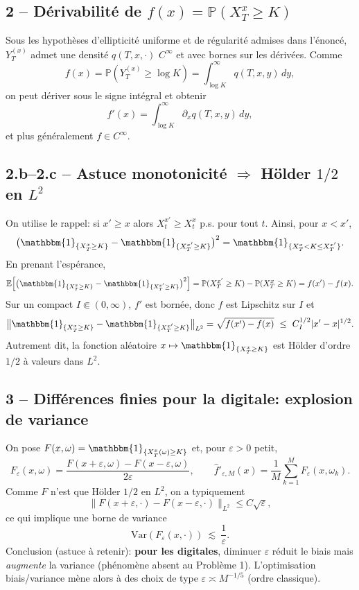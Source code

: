 \documentclass[11pt,a4paper]{article}
\newcommand{\E}{\mathbb{E}}
\newcommand{\Pp}{\mathbb{P}}
\newcommand{\1}{\mathbbm{1}}
\newcommand{\Var}{\mathrm{Var}}
\theoremstyle{plain}
\theoremstyle{definition}
\begin{document}
\subsection{2 -- Dérivabilité de $f(x)=\Pp(X_T^x\ge K)$}
Sous les hypothèses d'ellipticité uniforme et de régularité admises dans l'énoncé, $Y_T^{(x)}$ admet une densité $q(T,x,\cdot)$ $C^\infty$ et avec bornes sur les dérivées.
Comme
\[
f(x)=\Pp(Y_T^{(x)}\ge \log K)=\int_{\log K}^{\infty} q(T,x,y)\,dy,
\]
on peut dériver sous le signe intégral et obtenir
\[
f'(x)=\int_{\log K}^{\infty}\partial_x q(T,x,y)\,dy,
\]
et plus généralement $f\in C^\infty$.

\subsection{2.b--2.c -- Astuce monotonicité $\Rightarrow$ Hölder $1/2$ en $L^2$}
On utilise le rappel: si $x'\ge x$ alors $X_t^{x'}\ge X_t^{x}$ p.s. pour tout $t$.
Ainsi, pour $x<x'$,
\[
\big(\1_{\{X_T^{x}\ge K\}}-\1_{\{X_T^{x'}\ge K\}}\big)^2
=\1_{\{X_T^{x}<K\le X_T^{x'}\}}.
\]
En prenant l'espérance,
\[
\E\Big[\big(\1_{\{X_T^{x}\ge K\}}-\1_{\{X_T^{x'}\ge K\}}\big)^2\Big]
=\Pp(X_T^{x'}\ge K)-\Pp(X_T^{x}\ge K)=f(x')-f(x).
\]
Sur un compact $I\Subset(0,\infty)$, $f'$ est bornée, donc $f$ est Lipschitz sur $I$ et
\[
\big\|\1_{\{X_T^{x}\ge K\}}-\1_{\{X_T^{x'}\ge K\}}\big\|_{L^2}
=\sqrt{f(x')-f(x)}\ \le\ C_I^{1/2}|x'-x|^{1/2}.
\]
Autrement dit, la fonction aléatoire $x\mapsto \1_{\{X_T^{x}\ge K\}}$ est Hölder d'ordre $1/2$ à valeurs dans $L^2$.

\subsection{3 -- Différences finies pour la digitale: explosion de variance}
On pose $F(x,\omega)=\1_{\{X_T^{x}(\omega)\ge K\}}$ et, pour $\varepsilon>0$ petit,
\[
F_\varepsilon(x,\omega)=\frac{F(x+\varepsilon,\omega)-F(x-\varepsilon,\omega)}{2\varepsilon},
\qquad
\widehat f'_{\varepsilon,M}(x)=\frac1M\sum_{k=1}^M F_\varepsilon(x,\omega_k).
\]
Comme $F$ n'est que Hölder $1/2$ en $L^2$, on a typiquement
\[
\|F(x+\varepsilon,\cdot)-F(x-\varepsilon,\cdot)\|_{L^2}\le C\sqrt{\varepsilon},
\]
ce qui implique une borne de variance
\[
\Var(F_\varepsilon(x,\cdot))\ \lesssim\ \frac{1}{\varepsilon}.
\]
Conclusion (astuce à retenir): \textbf{pour les digitales}, diminuer $\varepsilon$ réduit le biais mais \emph{augmente} la variance (phénomène absent au Problème 1).
L'optimisation biais/variance mène alors à des choix de type $\varepsilon\asymp M^{-1/5}$ (ordre classique).
\medskip
\end{document}
